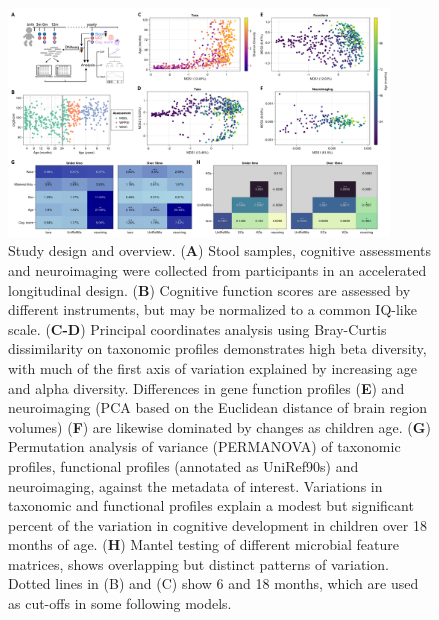\documentclass{article}
\begin{document}
\begin{figure}
    \centering
    \includegraphics[width=0.9\textwidth]{assets/Figure1.png}
    \caption{
        Study design and overview. (\textbf{A}) Stool samples, cognitive assessments and
        neuroimaging were collected from participants in an accelerated
        longitudinal design. (\textbf{B}) Cognitive function scores are assessed by
        different instruments, but may be normalized to a common IQ-like scale.
        (\textbf{C-D}) Principal coordinates analysis using Bray-Curtis dissimilarity on
        taxonomic profiles demonstrates high beta diversity, with much of the
        first axis of variation explained by increasing age and alpha diversity.
        Differences in gene function profiles (\textbf{E}) and neuroimaging (PCA based on
        the Euclidean distance of brain region volumes) (\textbf{F}) are likewise
        dominated by changes as children age. (\textbf{G}) Permutation analysis of
        variance (PERMANOVA) of taxonomic profiles, functional profiles
        (annotated as UniRef90s) and neuroimaging, against the metadata of
        interest. Variations in taxonomic and functional profiles explain a
        modest but significant percent of the variation in cognitive development
        in children over 18 months of age. (\textbf{H}) Mantel testing of different
        microbial feature matrices, shows overlapping but distinct patterns of
        variation. Dotted lines in (B) and (C) show 6 and 18 months, which are
        used as cut-offs in some following models.
    }
    \label{fig:1}
\end{figure}
\end{document}

